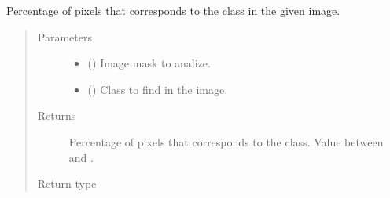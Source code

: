 \documentclass[letterpaper,10pt,english]{sphinxmanual}
\begin{document}

\begin{fulllineitems}
\label{\detokenize{utils/util:utils.util.foreground_percentage}}
Percentage of pixels that corresponds to the class in the given image.
\begin{quote}\begin{description}
\item[{Parameters}] \leavevmode\begin{itemize}
\item {} 
 () \textendash{} Image mask to analize.

\item {} 
 () \textendash{} Class to find in the image.

\end{itemize}

\item[{Returns}] \leavevmode
{} \textendash{} Percentage of pixels that corresponds to the class. Value between 
and .

\item[{Return type}] \leavevmode
{}

\end{description}\end{quote}

\end{fulllineitems}

\end{document}
